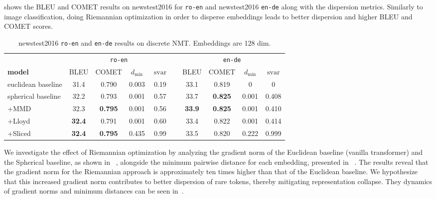\documentclass[10pt]{article} %
\newcommand{\langpair}[2]{\texttt{#1-#2}}
\newcommand\dmin{d_{\min}}
\begin{document}
 shows the BLEU and COMET results on newstest2016 for \langpair{ro}{en} and newstest2016 \langpair{en}{de} along with the dispersion metrics. Similarly to image classification, doing Riemannian optimization in order to disperse embeddings leads to better dispersion and higher BLEU and COMET scores.

\begin{table*}[ht]
    \centering
    \begin{tabular}{lccccccccc}
    \toprule
              & \multicolumn{4}{c}{\langpair{ro}{en}} && \multicolumn{4}{c}{\langpair{en}{de}}\\
       \textbf{model}  &  BLEU & COMET & $\dmin$ & $\operatorname{svar}$ && BLEU & COMET & $\dmin$&$\operatorname{svar}$\\ \midrule
       euclidean baseline & 31.4 & 0.790 & 0.003 &0.19 && 33.1&0.819&0&0\\ \midrule
    spherical baseline  & 32.2 &0.793&0.001 &0.57 & & 33.7&\textbf{0.825}&0.001&0.408\\ 
    \quad +MMD & 32.3&\textbf{0.795}&0.001& 0.56          && \textbf{33.9}&\textbf{0.825}&0.001&0.410\\
    \quad +Lloyd & \textbf{32.4}&0.791&0.001&0.60         && 33.4&0.822&0.001&0.414\\
    \quad +Sliced & \textbf{32.4} & \textbf{0.795} & 0.435& 0.99    && 33.5&0.820&0.222&0.999\\
       \bottomrule
    \end{tabular}%
    \caption{newstest2016 \langpair{ro}{en} and \langpair{en}{de} results on discrete NMT. Embeddings are 128 dim.}
    \label{tab:discrete_nmt_results}
\end{table*}
We investigate the effect of Riemannian optimization by analyzing the gradient norm of the Euclidean baseline (vanilla transformer) and the Spherical baseline, as shown in ~, alongside the minimum pairwise distance for each embedding, presented in ~. The results reveal that the gradient norm for the Riemannian approach is approximately ten times higher than that of the Euclidean baseline. We hypothesize that this increased gradient norm contributes to better dispersion of rare tokens, thereby mitigating representation collapse. They dynamics of gradient norms and minimum distances can be seen in~.
\end{document}
